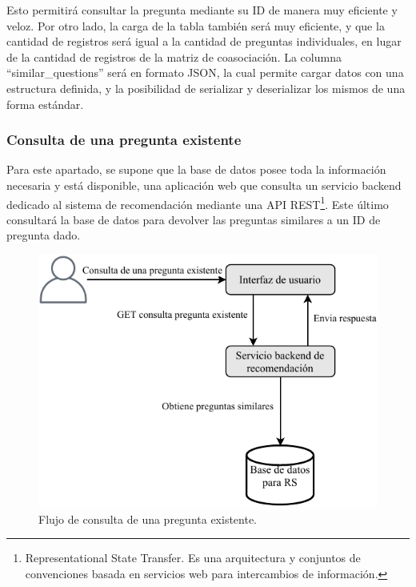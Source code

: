 Esto permitirá consultar la pregunta mediante su ID de manera muy eficiente y veloz. Por otro lado, la carga de la tabla también será muy eficiente, y que la cantidad de registros será igual a la cantidad de preguntas individuales, en lugar de la cantidad de registros de la matriz de coasociación. La columna “similar\_questions” será en formato JSON, la cual permite cargar datos con una estructura definida, y la posibilidad de serializar y deserializar los mismos de una forma estándar.

\subsubsection{Consulta de una pregunta existente}
Para este apartado, se supone que la base de datos posee toda la información necesaria y está disponible, una aplicación web que consulta un servicio backend dedicado al sistema de recomendación mediante una API REST\footnote{Representational State Transfer. Es una arquitectura y conjuntos de convenciones basada en servicios web para intercambios de información.}. Este último consultará la base de datos para devolver las preguntas similares a un ID de pregunta dado.

\begin{figure}
	\centering
	\includegraphics[width=0.6\linewidth]{8_problema_investigacion/imagenes/implementacion_rs_consulta}
	\caption{Flujo de consulta de una pregunta existente.}
	\label{fig:implementacionrsconsulta}
\end{figure}

